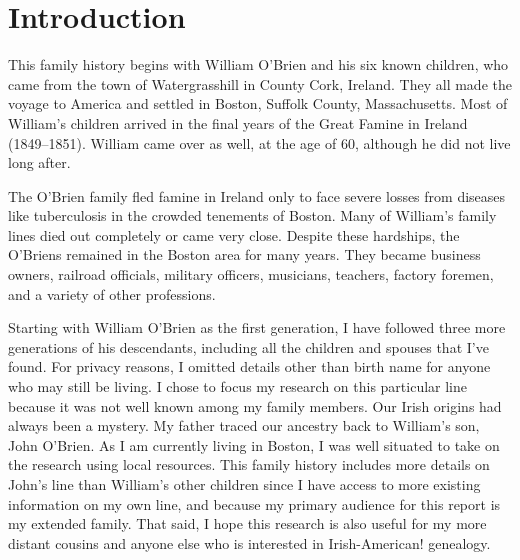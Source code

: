 \chapter{Introduction}

This family history begins with William O'Brien and his six known children, who came from the town of Watergrasshill in County Cork, Ireland. They all made the voyage to America and settled in Boston, Suffolk County, Massachusetts. Most of William's children arrived in the final years of the Great Famine in Ireland (1849--1851). William came over as well, at the age of 60, although he did not live long after.

The O'Brien family fled famine in Ireland only to face severe losses from diseases like tuberculosis in the crowded tenements of Boston. Many of William's family lines died out completely or came very close. Despite these hardships, the O'Briens remained in the Boston area for many years. They became business owners, railroad officials, military officers, musicians, teachers, factory foremen, and a variety of other professions.

Starting with William O'Brien as the first generation, I have followed three more generations of his descendants, including all the children and spouses that I've found. For privacy reasons, I omitted details other than birth name for anyone who may still be living. I chose to focus my research on this particular line because it was not well known among my family members. Our Irish origins had always been a mystery. My father traced our ancestry back to William's son, John O'Brien. As I am currently living in Boston, I was well situated to take on the research using local resources. This family history includes more details on John's line than William's other children since I have access to more existing information on my own line, and because my primary audience for this report is my extended family. That said, I hope this research is also useful for my more distant cousins and anyone else who is interested in Irish-American! genealogy. 

